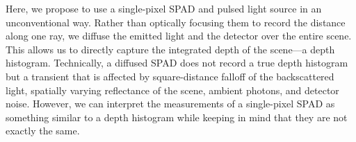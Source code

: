 Here, we propose to use a single-pixel SPAD and pulsed light source in an unconventional way. Rather than optically focusing them to record the distance along one ray, we diffuse the emitted light and the detector over the entire scene. This allows us to directly capture the integrated depth of the scene---a depth histogram. Technically, a diffused SPAD does not record a true depth histogram but a transient that is affected by square-distance falloff of the backscattered light, spatially varying reflectance of the scene, ambient photons, and detector noise. However, we can interpret the measurements of a single-pixel SPAD as something similar to a depth histogram while keeping in mind that they are not exactly the same.





